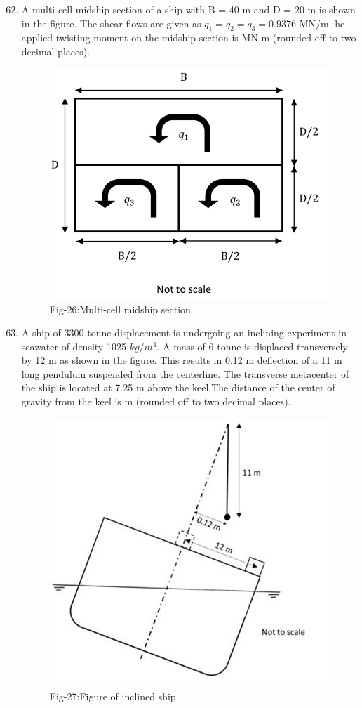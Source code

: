 \documentclass[journal]{IEEEtran}
\theoremstyle{remark}
\begin{document}
\begin{enumerate}[itemsep=1em]
\setcounter{enumi}{61}
\item A multi-cell midship section of a ship with B = 40 m and D = 20 m is shown in the figure. The shear-flows are given as $q_1=q_2=q_3=0.9376$ MN/m.
he applied twisting moment on the midship section is \underline{\hspace{2cm}} MN-m (rounded off to two decimal places).
\newpage
\vspace*{0.25cm}
\begin{figure}[H]
    \centering
    \includegraphics[width=0.3\columnwidth]{figs/fig-26.jpeg}
    \caption*{Fig-26:Multi-cell midship section}
    \label{fig:26}
\end{figure}
\end{enumerate}

\begin{enumerate}[itemsep=1em]
\setcounter{enumi}{62}
\item A ship of 3300 tonne displacement is undergoing an inclining experiment in seawater of density 1025 $kg/m^3$. A mass of 6 tonne is displaced transversely by 12 m as shown in the figure. This results in 0.12 m deflection of a 11 m long pendulum suspended from the centerline. The transverse metacenter of the ship is located at 7.25 m above the keel.The distance of the center of gravity from the keel is \underline{\hspace{2cm}} m (rounded off to two decimal places).
\begin{figure}[H]
    \centering
    \includegraphics[width=0.3\columnwidth]{figs/fig-27.jpeg}
    \caption*{Fig-27:Figure of inclined ship}
    \label{fig:27}
\end{figure}
\end{enumerate}
\end{document}
